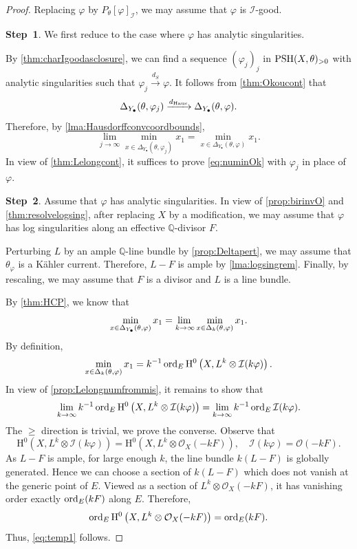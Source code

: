 \begin{proof}
Replacing $\varphi$ by $P_{\theta}[\varphi]_{\mathcal{I}}$, we may assume that $\varphi$ is $\mathcal{I}$-good.

\textbf{Step~1}. We first reduce to the case where $\varphi$ has analytic singularities.

By \cref{thm:charIgoodasclosure}, we can find a sequence $(\varphi_j)_j$ in $\mathrm{PSH}(X,\theta)_{>0}$ with analytic singularities such that $\varphi_j\xrightarrow{d_S}\varphi$. It follows from \cref{thm:Okoucont} that
\[
\Delta_{Y_{\bullet}}(\theta,\varphi_j)\xrightarrow{d_{\mathrm{Haus}}}\Delta_{Y_{\bullet}}(\theta,\varphi).
\]
Therefore, by \cref{lma:Hausdorffconvcoordbounds},
\[
\lim_{j\to\infty}\min_{x\in \Delta_{Y_{\bullet}}(\theta,\varphi_j)}x_1=\min_{x\in \Delta_{Y_{\bullet}}(\theta,\varphi)}x_1.
\]
In view of \cref{thm:Lelongcont}, it suffices to prove \eqref{eq:numinOk} with $\varphi_j$ in place of $\varphi$.

\textbf{Step~2}. Assume that $\varphi$ has analytic singularities. In view of \cref{prop:birinvO} and \cref{thm:resolvelogsing}, after replacing $X$ by a modification, we may assume that $\varphi$ has log singularities along an effective $\mathbb{Q}$-divisor $F$.


Perturbing $L$ by an ample $\mathbb{Q}$-line bundle by \cref{prop:Deltapert}, we may assume that $\theta_{\varphi}$ is a Kähler current. Therefore, $L-F$ is ample by \cref{lma:logsingrem}.
Finally, by rescaling, we may assume that $F$ is a divisor and $L$ is a line bundle.

	By \cref{thm:HCP}, we know that
	\[
		\min_{x\in \Delta_{Y_{\bullet}}(\theta,\varphi)}x_1=\adjustlimits\lim_{k\to\infty}\min_{x\in \Delta_k(\theta,\varphi)}x_1.
	\]
	By definition,
	\[
		\min_{x\in \Delta_k(\theta,\varphi)}x_1=k^{-1}\operatorname{ord}_E \mathrm{H}^0\left(X,L^k\otimes \mathcal{I}(k\varphi)\right).
	\]
	In view of \cref{prop:Lelongnumfrommis}, it remains to show that
	\begin{equation}\label{eq:temp1}
		\lim_{k\to\infty}k^{-1}\operatorname{ord}_E \mathrm{H}^0\left(X,L^k\otimes \mathcal{I}(k\varphi)\right)=\lim_{k\to\infty}k^{-1}\operatorname{ord}_E \mathcal{I}(k\varphi).
	\end{equation}
	The $\geq$ direction is trivial, we prove the converse. Observe that
	\[
		\mathrm{H}^0\left(X,L^k\otimes \mathcal{I}(k\varphi)\right)=\mathrm{H}^0\left(X,L^k\otimes \mathcal{O}_X(-kF)\right),\quad \mathcal{I}(k\varphi)=\mathcal{O}(-kF).
	\]
	As $L-F$ is ample, for large enough $k$, the line bundle $k(L-F)$ is globally generated. Hence we can choose a section of $k(L-F)$ which does not vanish at the generic point of $E$. Viewed as a section of $L^k\otimes\mathcal O_X(-kF)$, it has vanishing order exactly $\operatorname{ord}_E(kF)$ along $E$. Therefore,
	\[
		\operatorname{ord}_E  \mathrm{H}^0\left(X,L^k\otimes \mathcal{O}_X(-kF)\right)=\operatorname{ord}_E(kF).
	\]
	Thus, \eqref{eq:temp1} follows.
\end{proof}





